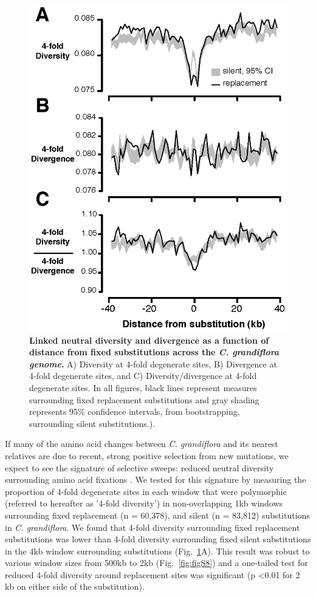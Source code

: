 \begin{figure}[ht!]
      \centering
       \includegraphics{Ch2Fig2}
    \caption{\textbf{Linked neutral diversity and divergence as a function of distance from fixed substitutions across the \textit{C. grandiflora genome}.} A) Diversity at 4-fold degenerate sites, B) Divergence at 4-fold degenerate sites, and C) Diversity/divergence at 4-fold degenerate sites. In all figures, black lines represent measures surrounding fixed replacement substitutions and gray shading represents 95\% confidence intervals, from bootstrapping, surrounding silent substitutions.).}
    \label{fig:fig2}
\end{figure}

If many of the amino acid changes between \textit{C. grandiflora} and its nearest relatives are due to recent, strong positive selection from new mutations, we expect to see the signature of selective sweeps: reduced neutral diversity surrounding amino acid fixations \citep{smith1974,Sattath2011-ns}. We tested for this signature by measuring the proportion of 4-fold degenerate sites in each window that were polymorphic (referred to hereafter as '4-fold diversity') in non-overlapping 1kb windows surrounding fixed replacement (n = 60,378), and silent (n = 83,812) substitutions in \textit{C. grandiflora}. We found that 4-fold diversity surrounding fixed replacement substitutions was lower than 4-fold diversity surrounding fixed silent substitutions in the 4kb window surrounding substitutions (Fig.~\ref{fig:fig2}A). This result was robust to various window sizes from 500kb to 2kb (Fig.~\ref{fig:figS8}) and a one-tailed test for reduced 4-fold diversity around replacement sites was significant (p \textless  0.01 for 2 kb on either side of the substitution).

